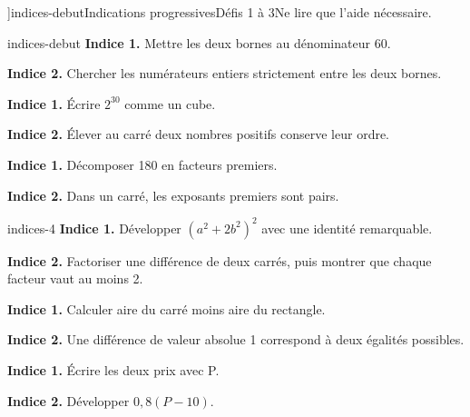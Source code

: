 \editionPage[\pdfbookmark[0]{Indications des défis}{bm-indices-debut-parent}]{indices-debut}{Indications progressives}{Défis 1 à 3}{Ne lire que l’aide nécessaire.}
\begin{blocEdition}{indices-debut}
\textbf{Indice 1.} Mettre les deux bornes au dénominateur 60.\par\medskip\textbf{Indice 2.} Chercher les numérateurs entiers strictement entre les deux bornes.\par
{}\textbf{Indice 1.} Écrire $2^{30}$ comme un cube.\par\medskip\textbf{Indice 2.} Élever au carré deux nombres positifs conserve leur ordre.\par
{}\textbf{Indice 1.} Décomposer 180 en facteurs premiers.\par\medskip\textbf{Indice 2.} Dans un carré, les exposants premiers sont pairs.\par

\end{blocEdition}
\begin{blocEdition}{indices-4}
\textbf{Indice 1.} Développer $(a^2+2b^2)^2$ avec une identité remarquable.\par\medskip\textbf{Indice 2.} Factoriser une différence de deux carrés, puis montrer que chaque facteur vaut au moins 2.\par
{}\textbf{Indice 1.} Calculer aire du carré moins aire du rectangle.\par\medskip\textbf{Indice 2.} Une différence de valeur absolue 1 correspond à deux égalités possibles.\par
{}\textbf{Indice 1.} Écrire les deux prix avec P.\par\medskip\textbf{Indice 2.} Développer $0{,}8(P-10)$.\par

\end{blocEdition}
